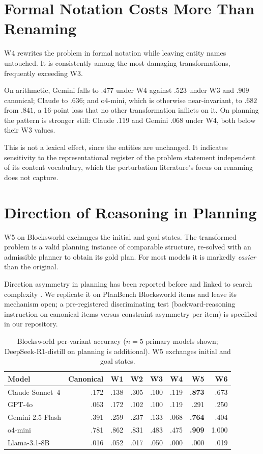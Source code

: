 \documentclass{article}
\begin{document}
\section{Formal Notation Costs More Than Renaming}

W4 rewrites the problem in formal notation while leaving entity names untouched. It
is consistently among the most damaging transformations, frequently exceeding W3.

On arithmetic, Gemini falls to $.477$ under W4 against $.523$ under W3 and $.909$
canonical; Claude to $.636$; and o4-mini, which is otherwise near-invariant, to
$.682$ from $.841$, a 16-point loss that no other transformation inflicts on it. On
planning the pattern is stronger still: Claude $.119$ and Gemini $.068$ under W4,
both below their W3 values.

This is not a lexical effect, since the entities are unchanged. It indicates
sensitivity to the representational register of the problem statement independent of
its content vocabulary, which the perturbation literature's focus on renaming does
not capture.

\section{Direction of Reasoning in Planning}

W5 on Blocksworld exchanges the initial and goal states. The transformed problem is
a valid planning instance of comparable structure, re-solved with an admissible
planner to obtain its gold plan. For most models it is markedly \emph{easier} than
the original.

Direction asymmetry in planning has been reported before and linked to search
complexity \citep{fwdbwd2024}. We replicate it on PlanBench Blocksworld items and
leave its mechanism open; a pre-registered discriminating test (backward-reasoning
instruction on canonical items versus constraint asymmetry per item) is specified in
our repository.

\begin{table}[t]
\centering
\caption{Blocksworld per-variant accuracy ($n{=}5$ primary models shown; DeepSeek-R1-distill on planning is additional). W5 exchanges initial and goal states.}
\label{tab:bw}
\small
\begin{tabular}{lrrrrrrr}
\toprule
Model & Canonical & W1 & W2 & W3 & W4 & W5 & W6 \\
\midrule
Claude Sonnet~4 & .172 & .138 & .305 & .100 & .119 & \textbf{.873} & .673 \\
GPT-4o & .063 & .172 & .102 & .100 & .119 & .291 & .250 \\
Gemini 2.5 Flash & .391 & .259 & .237 & .133 & .068 & \textbf{.764} & .404 \\
o4-mini & .781 & .862 & .831 & .483 & .475 & \textbf{.909} & 1.000 \\
Llama-3.1-8B & .016 & .052 & .017 & .050 & .000 & .000 & .019 \\
\bottomrule
\end{tabular}
\end{table}
\end{document}
